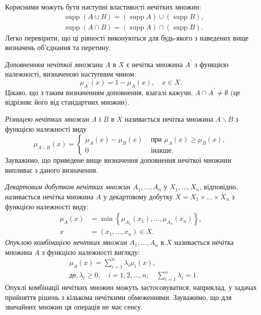 \documentclass[14pt, a4paper, oneside]{extarticle}
\numberwithin{equation}{section}
\begin{document}
Корисними можуть бути наступні властивості нечітких множин:
\begin{equation*}
\begin{aligned}
& \operatorname{supp}(A \cup B)=(\operatorname{supp} A) \cup(\operatorname{supp} B), \\
& \operatorname{supp}(A \cap B)=(\operatorname{supp} A) \cap(\operatorname{supp} B).
\end{aligned}
\end{equation*}
Легко перевірити, що ці рівності виконуються для будь-якого з наведених вище визначень об'єднання та перетину.

\textit{Доповненням нечіткої множини} $A$ в $X$ є нечітка множина $A^{\prime}$ з функцією належності, визначеною наступним чином:
\begin{equation*}
\mu_{A^{\prime}}(x)=1-\mu_A(x), \quad x \in X.
\end{equation*}
Цікаво, що з таким визначенням доповнення, взагалі кажучи, $A \cap A^{\prime} \neq \emptyset$ (це відрізняє його від стандартних множин).

\textit{Різницею нечітких множин} $A$ і $B$ в $X$ називається нечітка множина $A \backslash B$ з функцією належності виду
\begin{equation*}\mu_{A \backslash B}(x)=
\begin{cases}
\mu_A(x)-\mu_B(x) & \text { при } \mu_A(x) \geq \mu_B(x),\\
0 & \text { інакше. }
\end{cases}\end{equation*}
Зауважимо, що приведене вище визначення доповнення нечіткої множини випливає з даного визначення.

\textit{Декартовим добутком нечітких множин} $A_1, \ldots, A_n$ у $X_1, \ldots, X_n$, відповідно, називається нечітка множина $A$ у декартовому добутку $X=X_1 \times \ldots \times X_n$ з функцією належності виду:
\begin{equation*}
\begin{aligned}
\mu_A(x) & =\min \left\{\mu_{A_1}\left(x_1\right), \ldots, \mu_{A_n}\left(x_n\right)\right\}, \\
x & =\left(x_1, \ldots, x_n\right) \in X .
\end{aligned}
\end{equation*}
\textit{Опуклою комбінацією нечітких множин} $A_1, \ldots, A_n$ в $X$ називається нечітка множина $A$ з функцією належності вигляду:
\begin{equation*}
\begin{aligned}
& \mu_{A}(x)=\sum_{i=1}^n \lambda_i \mu_i(x), \\
& \text {де}, \lambda_i \geq 0, \quad i=1,2, \ldots, n, \quad\sum_{i=1}^n \lambda_i=1 .
\end{aligned}
\end{equation*}
Опуклі комбінації нечітких множин можуть застосовуватися, наприклад, у задачах прийняття рішень з кількома нечіткими обмеженнями. Зауважимо, що для звичайних множин ця операція не має сенсу.
\end{document}
